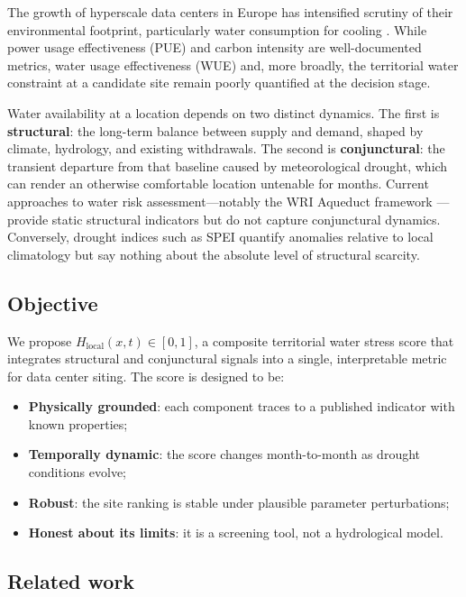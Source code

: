 \documentclass[11pt,a4paper]{article}
\begin{document}
The growth of hyperscale data centers in Europe has intensified scrutiny of their environmental footprint, particularly water consumption for cooling \citep{mytton2021,shehabi2016}. While power usage effectiveness (PUE) and carbon intensity are well-documented metrics, water usage effectiveness (WUE) and, more broadly, the territorial water constraint at a candidate site remain poorly quantified at the decision stage.

Water availability at a location depends on two distinct dynamics. The first is \textbf{structural}: the long-term balance between supply and demand, shaped by climate, hydrology, and existing withdrawals. The second is \textbf{conjunctural}: the transient departure from that baseline caused by meteorological drought, which can render an otherwise comfortable location untenable for months. Current approaches to water risk assessment---notably the WRI Aqueduct framework \citep{hofste2019}---provide static structural indicators but do not capture conjunctural dynamics. Conversely, drought indices such as SPEI \citep{vicenteserrano2010} quantify anomalies relative to local climatology but say nothing about the absolute level of structural scarcity.

\subsection{Objective}

We propose $H_{\text{local}}(x,t) \in [0,1]$, a composite territorial water stress score that integrates structural and conjunctural signals into a single, interpretable metric for data center siting. The score is designed to be:

\begin{itemize}
  \item \textbf{Physically grounded}: each component traces to a published indicator with known properties;
  \item \textbf{Temporally dynamic}: the score changes month-to-month as drought conditions evolve;
  \item \textbf{Robust}: the site ranking is stable under plausible parameter perturbations;
  \item \textbf{Honest about its limits}: it is a screening tool, not a hydrological model.
\end{itemize}

\subsection{Related work}
\end{document}
